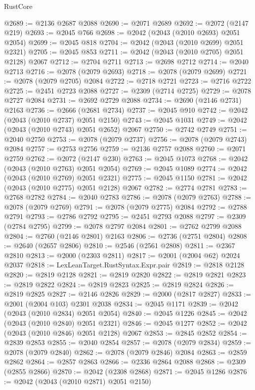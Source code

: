 \begin{lexlean}{RustCore}
\begin{coremodule}
@2689 := @2136 @2687 @2088
@2690 := @2071 @2689
@2692 := @2072 (@2147 @219)
@2693 := @2045 @766
@2698 := @2042 (@2043 (@2010 @2693) @2051 @2054)
@2699 := @2045 @818
@2704 := @2042 (@2043 (@2010 @2699) @2051 @2321)
@2705 := @2045 @853
@2711 := @2042 (@2043 (@2010 @2705) @2051 @2128) @2067
@2712 := @2704 @2711
@2713 := @2698 @2712
@2714 := @2040 @2713
@2716 := @2078 (@2079 @2693)
@2718 := @2078 (@2079 @2699)
@2721 := @2078 (@2079 @2705) @2084
@2722 := @2718 @2721
@2723 := @2716 @2722
@2725 := @2451 @2723 @2088
@2727 := @2309 (@2714 @2725)
@2729 := @2078 @2727 @2084
@2731 := @2692 @2729 @2088
@2734 := @2690 (@2146 @2731) @2163
@2736 := @2666 (@2681 @2734)
@2737 := @2045 @910
@2742 := @2042 (@2043 (@2010 @2737) @2051 @2150)
@2743 := @2045 @1031
@2749 := @2042 (@2043 (@2010 @2743) @2051 @2652) @2067
@2750 := @2742 @2749
@2751 := @2040 @2750
@2753 := @2078 (@2079 @2737)
@2756 := @2078 (@2079 @2743) @2084
@2757 := @2753 @2756
@2759 := @2136 @2757 @2088
@2760 := @2071 @2759
@2762 := @2072 (@2147 @230)
@2763 := @2045 @1073
@2768 := @2042 (@2043 (@2010 @2763) @2051 @2054)
@2769 := @2045 @1089
@2774 := @2042 (@2043 (@2010 @2769) @2051 @2321)
@2775 := @2045 @1150
@2781 := @2042 (@2043 (@2010 @2775) @2051 @2128) @2067
@2782 := @2774 @2781
@2783 := @2768 @2782
@2784 := @2040 @2783
@2786 := @2078 (@2079 @2763)
@2788 := @2078 (@2079 @2769)
@2791 := @2078 (@2079 @2775) @2084
@2792 := @2788 @2791
@2793 := @2786 @2792
@2795 := @2451 @2793 @2088
@2797 := @2309 (@2784 @2795)
@2799 := @2078 @2797 @2084
@2801 := @2762 @2799 @2088
@2804 := @2760 (@2146 @2801) @2163
@2806 := @2736 (@2751 @2804)
@2808 := @2640 (@2657 @2806)
@2810 := @2546 (@2561 @2808)
@2811 := @2367 @2810
@2813 := @2000 (@2303 @2811)
@2817 := @2001 (@2004 @62) @2024 @2037
@2818 := LexLeanTarget.RustSyntax.Expr.pair
@2819 := @2818 @2128
@2820 := @2819 @2128
@2821 := @2819 @2820
@2822 := @2819 @2821
@2823 := @2819 @2822
@2824 := @2819 @2823
@2825 := @2819 @2824
@2826 := @2819 @2825
@2827 := @2146 @2826
@2829 := @2000 (@2817 @2827)
@2833 := @2001 (@2004 @103) @2301 @2038
@2834 := @2045 @1171
@2839 := @2042 (@2043 (@2010 @2834) @2051 @2054)
@2840 := @2045 @1226
@2845 := @2042 (@2043 (@2010 @2840) @2051 @2321)
@2846 := @2045 @1277
@2852 := @2042 (@2043 (@2010 @2846) @2051 @2128) @2067
@2853 := @2845 @2852
@2854 := @2839 @2853
@2855 := @2040 @2854
@2857 := @2078 (@2079 @2834)
@2859 := @2078 (@2079 @2840)
@2862 := @2078 (@2079 @2846) @2084
@2863 := @2859 @2862
@2864 := @2857 @2863
@2866 := @2336 @2864 @2088
@2868 := @2309 (@2855 @2866)
@2870 := @2042 (@2308 @2868)
@2871 := @2045 @1286
@2876 := @2042 (@2043 (@2010 @2871) @2051 @2150)

\end{coremodule}
\end{lexlean}
